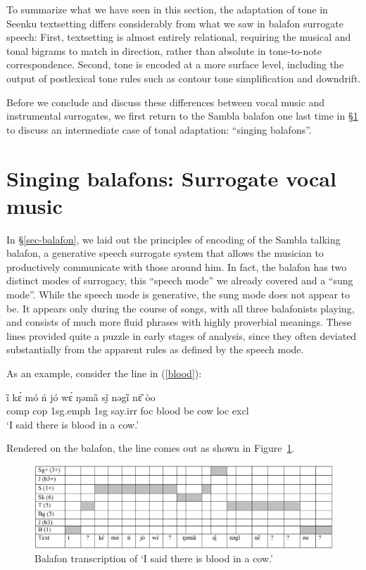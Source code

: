 \documentclass[output=paper]{langscibook}
\begin{document}
To summarize what we have seen in this section, the adaptation of tone in Seenku textsetting differs considerably from what we saw in balafon surrogate speech: First, textsetting is almost entirely relational, requiring the musical and tonal bigrams to match in direction, rather than absolute in tone-to-note correspondence. Second, tone is encoded at a more surface level, including the output of postlexical tone rules such as contour tone simplification and downdrift. 

Before we conclude and discuss these differences between vocal music and instrumental surrogates, we first return to the Sambla balafon one last time in \S\ref{sec-surrogate-vocal} to discuss an intermediate case of tonal adaptation: ``singing balafons''. 

\section{Singing balafons: Surrogate vocal music}\label{sec-surrogate-vocal}

In \S\ref{sec-balafon}, we laid out the principles of encoding of the Sambla talking balafon, a generative speech surrogate system that allows the musician to productively communicate with those around him. In fact, the balafon has two distinct modes of surrogacy, this ``speech mode'' we already covered and a ``sung mode''.  While the speech mode is generative, the sung mode does not appear to be. It appears only during the course of songs, with all three balafonists playing, and consists of much more fluid phrases with highly proverbial meanings. These lines provided quite a puzzle in early stages of analysis, since they often deviated substantially from the apparent rules as defined by the speech mode.

As an example, consider the line in (\ref{blood}): 

\ea\label{blood} 
\gll ȉ kɛ́ mó ń jó wɛ́ ŋəmȁ sḭ̌ nəgȉ nɛ̏ òo \\
{\sc comp} {\sc cop} {\sc 1sg.emph} {\sc 1sg} say.{\sc irr} {\sc foc} blood be cow {\sc loc} {\sc excl} \\
\glt `I said there is blood in a cow.' \\
\z 

Rendered on the balafon, the line comes out as shown in Figure~\ref{blood-balafon}. 

\begin{figure}
  \includegraphics[scale=.4, angle=90]{figures/gbene-gosera-so-balafon.eps}
  \caption{Balafon transcription of `I said there is blood in a cow.'}\label{blood-balafon} 
\end{figure} 
\end{document}
